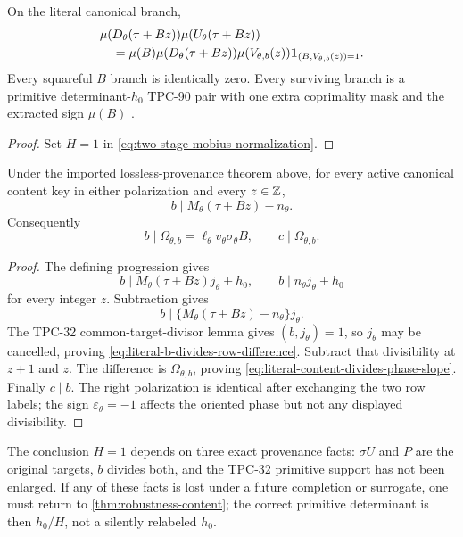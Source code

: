 \begin{corollary}
\label{cor:literal-normalized-mobius-pair}
On the literal canonical branch,
\begin{align}
 &\mu(D_\theta(\tau+Bz))
 \mu(U_\theta(\tau+Bz))
\notag\\
 &\quad=
 \mu(B)
 \mu(D_\theta(\tau+Bz))
 \mu(V_{\theta,b}(z))
 \mathbf 1_{(B,V_{\theta,b}(z))=1}.
\label{eq:literal-normalized-mobius-pair}
\end{align}
Every squareful \(B\) branch is identically zero.  Every surviving
branch is a primitive determinant-\(h_0\) TPC-90 pair with one extra
coprimality mask and the extracted sign \(\mu(B)\)
\citep{WangTPC90}.
\end{corollary}

\begin{proof}
Set \(H=1\) in
\eqref{eq:two-stage-mobius-normalization}.
\end{proof}

\begin{proposition}
\label{prop:literal-content-divides-phase-slope}
Under the imported lossless-provenance theorem above, for every
active canonical content key in either polarization and every
\(z\in\mathbb Z\),
\begin{equation}
 b\mid M_\theta(\tau+Bz)-n_\theta.
\label{eq:literal-b-divides-row-difference}
\end{equation}
Consequently
\begin{equation}
 b\mid\Omega_{\theta,b}
 =\ell_\theta v_\theta\sigma_\theta B,
 \qquad
 c\mid\Omega_{\theta,b}.
\label{eq:literal-content-divides-phase-slope}
\end{equation}
\end{proposition}

\begin{proof}
The defining progression gives
\[
 b\mid M_\theta(\tau+Bz)j_\theta+h_0,
 \qquad
 b\mid n_\theta j_\theta+h_0
\]
for every integer \(z\).  Subtraction gives
\[
 b\mid
 \{M_\theta(\tau+Bz)-n_\theta\}j_\theta.
\]
The TPC-32 common-target-divisor lemma gives
\((b,j_\theta)=1\), so \(j_\theta\) may be cancelled, proving
\eqref{eq:literal-b-divides-row-difference}.  Subtract that
divisibility at \(z+1\) and \(z\).  The difference is
\(\Omega_{\theta,b}\), proving
\eqref{eq:literal-content-divides-phase-slope}.  Finally \(c\mid b\).
The right polarization is identical after exchanging the two row
labels; the sign \(\varepsilon_\theta=-1\) affects the oriented phase
but not any displayed divisibility.
\end{proof}

\begin{remark}
The conclusion \(H=1\) depends on three exact provenance facts:
\(\sigma U\) and \(P\) are the original targets, \(b\) divides both,
and the TPC-32 primitive support has not been enlarged.  If any of
these facts is lost under a future completion or surrogate, one must
return to \cref{thm:robustness-content}; the correct primitive
determinant is then \(h_0/H\), not a silently relabeled \(h_0\).
\end{remark}
